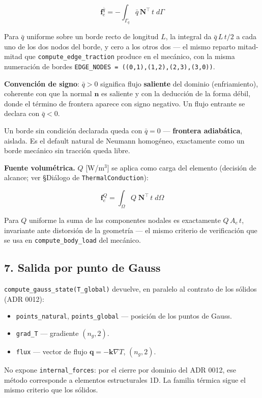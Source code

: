\documentclass[11pt,letterpaper,oneside]{report}
\begin{document}
\[
\mathbf f^{\bar q}_e = -\int_{\Gamma_q} \bar q\,\mathbf N^\top\,t\;d\Gamma
\]

Para $\bar q$ uniforme sobre un borde recto de longitud $L$, la integral da $\bar q\,L\,t/2$ a cada uno de los dos nodos del borde, y cero a los otros dos --- el mismo reparto mitad-mitad que \texttt{compute\_edge\_traction} produce en el mecánico, con la misma numeración de bordes \texttt{EDGE\_NODES = ((0,1),(1,2),(2,3),(3,0))}.

\textbf{Convención de signo}: $\bar q > 0$ significa flujo \textbf{saliente} del dominio (enfriamiento), coherente con que la normal $\mathbf n$ es saliente y con la deducción de la forma débil, donde el término de frontera aparece con signo negativo. Un flujo entrante se declara con $\bar q < 0$.

Un borde sin condición declarada queda con $\bar q = 0$ --- \textbf{frontera adiabática}, aislada. Es el default natural de Neumann homogéneo, exactamente como un borde mecánico sin tracción queda libre.

\textbf{Fuente volumétrica.} $Q$ [W/m\ensuremath{^{3}}] se aplica como carga del elemento (decisión de alcance; ver §Diálogo de \texttt{ThermalConduction}):

\[
\mathbf f^{Q}_e = \int_\Omega Q\;\mathbf N^\top\,t\;d\Omega
\]

Para $Q$ uniforme la suma de las componentes nodales es exactamente $Q\,A_e\,t$, invariante ante distorsión de la geometría --- el mismo criterio de verificación que se usa en \texttt{compute\_body\_load} del mecánico.

\subsection{7. Salida por punto de Gauss}

\texttt{compute\_gauss\_state(T\_global)} devuelve, en paralelo al contrato de los sólidos (ADR 0012):

\begin{itemize}
  \item \texttt{points\_natural}, \texttt{points\_global} --- posición de los puntos de Gauss.
  \item \texttt{grad\_T} --- gradiente $(n_g, 2)$.
  \item \texttt{flux} --- vector de flujo $\mathbf q = -\mathbf k\nabla T$, $(n_g, 2)$.
\end{itemize}

No expone \texttt{internal\_forces}: por el cierre por dominio del ADR 0012, ese método corresponde a elementos estructurales 1D. La familia térmica sigue el mismo criterio que los sólidos.
\end{document}
